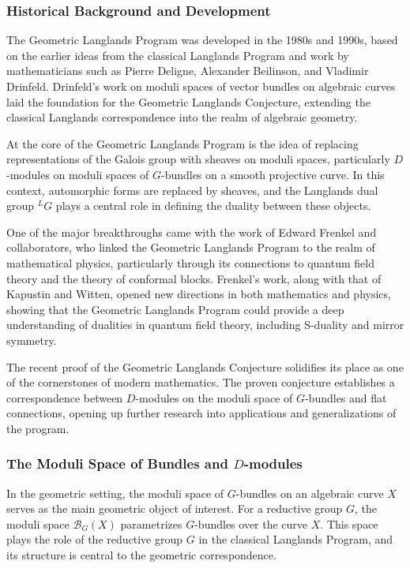 \documentclass{article}
\theoremstyle{remark}
\begin{document}
\subsubsection{Historical Background and Development}

The Geometric Langlands Program was developed in the 1980s and 1990s, based on the earlier ideas from the classical Langlands Program and work by mathematicians such as Pierre Deligne, Alexander Beilinson, and Vladimir Drinfeld. Drinfeld's work on moduli spaces of vector bundles on algebraic curves laid the foundation for the Geometric Langlands Conjecture, extending the classical Langlands correspondence into the realm of algebraic geometry.

At the core of the Geometric Langlands Program is the idea of replacing representations of the Galois group with sheaves on moduli spaces, particularly $D$-modules on moduli spaces of $G$-bundles on a smooth projective curve. In this context, automorphic forms are replaced by sheaves, and the Langlands dual group ${}^L G$ plays a central role in defining the duality between these objects.

One of the major breakthroughs came with the work of Edward Frenkel and collaborators, who linked the Geometric Langlands Program to the realm of mathematical physics, particularly through its connections to quantum field theory and the theory of conformal blocks. Frenkel's work, along with that of Kapustin and Witten, opened new directions in both mathematics and physics, showing that the Geometric Langlands Program could provide a deep understanding of dualities in quantum field theory, including S-duality and mirror symmetry.

The recent proof of the Geometric Langlands Conjecture solidifies its place as one of the cornerstones of modern mathematics. The proven conjecture establishes a correspondence between $D$-modules on the moduli space of $G$-bundles and flat connections, opening up further research into applications and generalizations of the program.

\subsubsection{The Moduli Space of Bundles and $D$-modules}

In the geometric setting, the moduli space of $G$-bundles on an algebraic curve $X$ serves as the main geometric object of interest. For a reductive group $G$, the moduli space $\mathcal{B}_G(X)$ parametrizes $G$-bundles over the curve $X$. This space plays the role of the reductive group $G$ in the classical Langlands Program, and its structure is central to the geometric correspondence.
\end{document}
